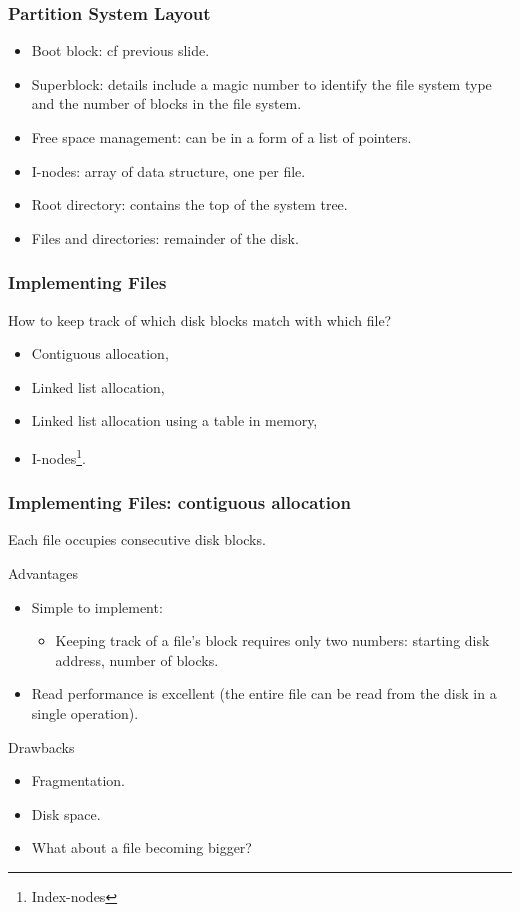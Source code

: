 \begin{frame}
  \frametitle{Partition System Layout}
    \begin{itemize}
      \item Boot block: cf previous slide.
      \item Superblock: details include a magic number to identify the file system type and the number of blocks in the file system.
      \item Free space management: can be in a form of a list of pointers.
      \item I-nodes: array of data structure, one per file.
      \item Root directory: contains the top of the system tree.
      \item Files and directories: remainder of the disk.
  \end{itemize}
\end{frame}

\begin{frame}
  \frametitle{Implementing Files}
  How to keep track of which disk blocks match with which file?
    \begin{itemize}
      \item Contiguous allocation,
      \item Linked list allocation,
      \item Linked list allocation using a table in memory,
      \item I-nodes\footnote{Index-nodes}.
  \end{itemize}
\end{frame}

\begin{frame}
    \frametitle{Implementing Files: contiguous allocation}
    Each file occupies consecutive disk blocks.
    \begin{block}{Advantages}
        \begin{itemize}
            \item Simple to implement:
                \begin{itemize}
                    \item Keeping track of a file's block requires only two numbers: starting disk address, number of blocks.
                \end{itemize}
            \item Read performance is excellent (the entire file can be read from the disk in a single operation).
        \end{itemize}
    \end{block}
    \begin{block}{Drawbacks}
        \begin{itemize}
            \item Fragmentation.
            \item Disk space.
            \item What about a file becoming bigger?
        \end{itemize}
    \end{block}
\end{frame}

